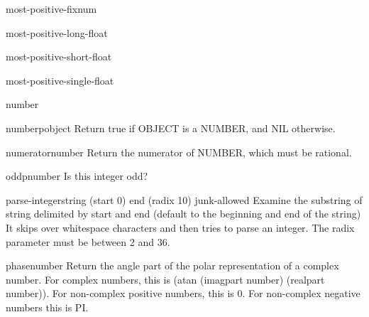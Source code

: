 \begin{constant}{most-positive-fixnum}{}{}
  
\end{constant}

\begin{constant}{most-positive-long-float}{}{}
  
\end{constant}

\begin{constant}{most-positive-short-float}{}{}
  
\end{constant}

\begin{constant}{most-positive-single-float}{}{}
  
\end{constant}

\begin{class}{number}{}{}
  
\end{class}

\begin{function}{numberp}{object}{}
  Return true if OBJECT is a NUMBER, and NIL otherwise.
\end{function}

\begin{function}{numerator}{number}{}
  Return the numerator of NUMBER, which must be rational.
\end{function}

\begin{function}{oddp}{number}{}
  Is this integer odd?
\end{function}

\begin{function}{parse-integer}{string \key (start 0) end (radix 10) junk-allowed}{}
  Examine the substring of string delimited by start and end
  (default to the beginning and end of the string)  It skips over
  whitespace characters and then tries to parse an integer. The
  radix parameter must be between 2 and 36.
\end{function}

\begin{function}{phase}{number}{}
  Return the angle part of the polar representation of a complex number.
  For complex numbers, this is (atan (imagpart number) (realpart number)).
  For non-complex positive numbers, this is 0. For non-complex negative
  numbers this is PI.
\end{function}

